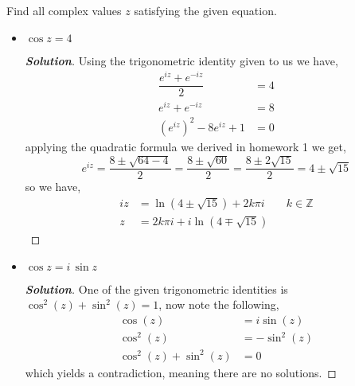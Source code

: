 \documentclass[11pt]{article}
\newenvironment{problem}[2][Problem\!]{\begin{trivlist}
\item[\hskip \labelsep {\bfseries #1}\hskip \labelsep {\bfseries #2}]}{\end{trivlist}}
\newenvironment{solution}{\begin{proof}[\textbf{\textit{Solution}}] }{\end{proof}}
\newcommand{\zz}{\mathbb Z}   %
\newcommand{\lrp}[1]{\left(#1\right)}
\begin{document}
\begin{problem}{5.5}
Find all complex values $z$ satisfying the given equation.
\begin{itemize}[itemsep=3em]
\item[(a)] $\cos z = 4$
\begin{solution}
  Using the trigonometric identity given to us we have,
  \begin{align*}
    \dfrac{e^{i z} + e^{-i z }}{2} &= 4 \\
    e^{i z} + e^{- i z} &= 8 \\
    \lrp{e^{i z}}^{2} -8e^{i z} + 1  &= 0
  \end{align*}
  applying the quadratic formula we derived in homework 1 we get,
  \[e^{iz} = \dfrac{8 \pm \sqrt{64 - 4}}{2} = \dfrac{8 \pm \sqrt{60}}{2} = \dfrac{8 \pm 2\sqrt{15}}{2} = 4 \pm \sqrt{15}\]
  so we have,
  \begin{align*}
    i z &= \ln(4 \pm \sqrt{15}) + 2k\pi i  && k\in \zz \\
    z &= 2k\pi i + i\ln(4\mp\sqrt{15} )
  \end{align*}
\end{solution}

\item[(b)] $\cos z = i\,\sin z$
\begin{solution}
  One of the given trigonometric identities is $\cos^{2}(z) + \sin^{2}(z) = 1$, now note the following,
  \begin{align*}
    \cos(z) &= i\sin(z) \\
    \cos^{2}(z) &= -\sin^2(z) \\
    \cos^{2}(z) +\sin^{2}(z) &= 0
  \end{align*}
  which yields a contradiction, meaning there are no solutions. 
\end{solution}

\end{itemize}
\end{problem}

\newpage %
\end{document}
